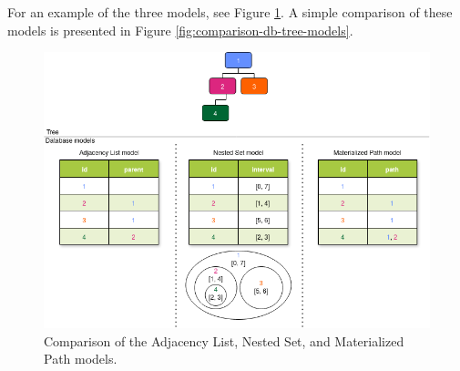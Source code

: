 For an example of the three models, see Figure \ref{fig:comparison-db-tree-models-pic}.
A simple comparison of these models is presented in Figure \ref{fig:comparison-db-tree-models}.

\begin{figure}[H]
	\centering
	\label{fig:comparison-db-tree-models-pic}
	\includegraphics[scale=0.6]{./images/tree-map.drawio.png}
	\caption{Comparison of the Adjacency List, Nested Set, and Materialized Path models.}
\end{figure}

\newcommand{\goodcomplexity}[1]{\vspace{.4em}\textcolor{darkgreen}{\checkmark}\vspace{.4em}}
\newcommand{\mediumcomplexity}[1]{\vspace{.4em}\textcolor{orange}{\textcircled{}}\vspace{.4em}}
\newcommand{\badcomplexity}[1]{\vspace{.4em}\textcolor{red}{X}\vspace{.4em}}

\newcommand{\goodefficency}[1]{\textcolor{darkgreen}{\checkmark}}
\newcommand{\mediumefficency}[1]{\textcolor{orange}{\textcircled{}}}
\newcommand{\badefficency}[1]{\textcolor{red}{X}}

